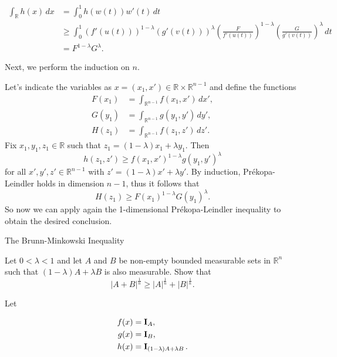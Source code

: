 \documentclass[UTF8,a4paper,10pt]{article}
\begin{document}
\begin{equation}
  \begin{aligned}
\int_{\mathbb{R}} h(x) \, dx &= \int_{0}^{1} h(w(t)) w'(t) \, dt \\
&\geq \int_{0}^{1} \left(f'(u(t))\right)^{1-\lambda} \left(g'(v(t))\right)^\lambda \left(\frac{F}{f'(u(t))}\right)^{1-\lambda} \left(\frac{G}{g'(v(t))}\right)^\lambda \, dt \\
&= F^{1-\lambda}G^\lambda.
\end{aligned}
\end{equation}  



Next, we perform the induction on $n$. 

Let's indicate the variables as $x = (x_1, x') \in \mathbb{R} \times \mathbb{R}^{n-1}$ and define the functions
\begin{align*}
F(x_1) &= \int_{\mathbb{R}^{n-1}} f(x_1, x') \, dx', \\
G(y_1) &= \int_{\mathbb{R}^{n-1}} g(y_1, y') \, dy', 
\\
H(z_1) &= \int_{\mathbb{R}^{n-1}} f(z_1, z') \, dz'
.
\end{align*}
Fix $x_1, y_1, z_1 \in \mathbb{R}$ such that $z_1 = (1 - \lambda)x_1 + \lambda y_1$. Then
\[
h(z_1, z') \geq f(x_1, x')^{1-\lambda} g(y_1, y')^\lambda
\]
for all $x', y', z' \in \mathbb{R}^{n-1}$ with $z' = (1-\lambda)x' + \lambda y'$. By induction, Prékopa-Leindler holds in dimension $n - 1$, thus it follows that
\[
H(z_1) \geq F(x_1)^{1-\lambda} G(y_1)^\lambda.
\]
So now we can apply again the 1-dimensional Prékopa-Leindler inequality to obtain the desired conclusion.



\pagebreak
\begin{Problem}[]{The Brunn-Minkowski Inequality}

  Let $0 < \lambda < 1$ and let $A$ and $B$ be non-empty bounded measurable sets in $\mathbb{R}^n$ such that ${(1 - \lambda)A + \lambda B}$ is also measurable. Show that
$$
|A + B|^\frac{1}{n} \geq |A|^\frac{1}{n} + |B|^\frac{1}{n}.
$$

\end{Problem}

Let

\begin{equation*}
  \begin{aligned}
    f(x) &= \operatorname{\mathbf{I}}_{A},\\
    g(x) &= \operatorname{\mathbf{I}}_{B},\\
    h(x) &= \operatorname{\mathbf{I}}_{(1-\lambda)A+\lambda B}.
\end{aligned}
\end{equation*}  
\end{document}
